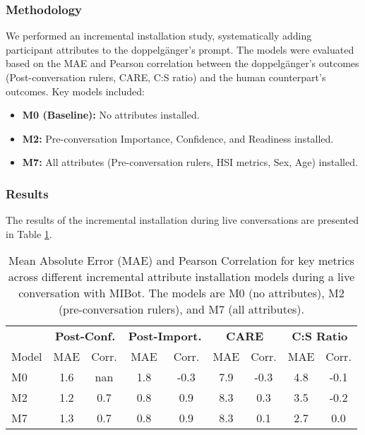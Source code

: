 \subsubsection{Methodology}

We performed an incremental installation study, systematically adding participant attributes to the doppelgänger's prompt. The models were evaluated based on the MAE and Pearson correlation between the doppelgänger's outcomes (Post-conversation rulers, CARE, C:S ratio) and the human counterpart's outcomes. Key models included:
\begin{itemize}
    \item \textbf{M0 (Baseline):} No attributes installed.
    \item \textbf{M2:} Pre-conversation Importance, Confidence, and Readiness installed.
    \item \textbf{M7:} All attributes (Pre-conversation rulers, HSI metrics, Sex, Age) installed.
\end{itemize}

\subsubsection{Results}

The results of the incremental installation during live conversations are presented in Table \ref{tab:incremental_installation}.

\begin{table}[h]
\centering
\caption[Incremental Attribute Installation Results]{Mean Absolute Error (MAE) and Pearson Correlation for key metrics across different incremental attribute installation models during a live conversation with MIBot. The models are M0 (no attributes), M2 (pre-conversation rulers), and M7 (all attributes).}
\label{tab:incremental_installation}
\begin{tabular}{|l|cc|cc|cc|cc|}
\hline
 & \multicolumn{2}{c|}{\textbf{Post-Conf.}} & \multicolumn{2}{c|}{\textbf{Post-Import.}} & \multicolumn{2}{c|}{\textbf{CARE}} & \multicolumn{2}{c|}{\textbf{C:S Ratio}} \\
Model & MAE & Corr. & MAE & Corr. & MAE & Corr. & MAE & Corr. \\ \hline
M0 & 1.6 & nan & 1.8 & -0.3 & 7.9 & -0.3 & 4.8 & -0.1 \\
M2 & 1.2 & 0.7 & 0.8 & 0.9 & 8.3 & 0.3 & 3.5 & -0.2 \\
M7 & 1.3 & 0.7 & 0.8 & 0.9 & 8.3 & 0.1 & 2.7 & 0.0 \\ \hline
\end{tabular}
\end{table}

